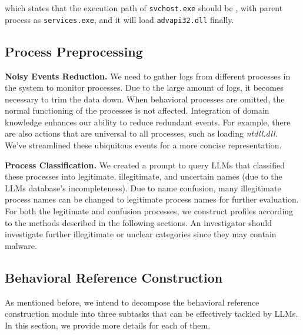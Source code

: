 which states that the execution path of \texttt{svchost.exe} should be , with parent process 
as \texttt{services.exe}, and it will load \texttt{advapi32.dll} finally.



\subsection{Process Preprocessing}
\noindent
{\bf Noisy Events Reduction.} 
We need to gather logs from different processes in the system to monitor processes.
Due to the large amount of logs, it becomes necessary to trim the data down. 
When behavioral processes are omitted, the normal functioning of the processes is not affected. Integration of domain knowledge enhances our ability to reduce redundant events. For example, there are also actions that are universal to all processes, such as loading \textit{ntdll.dll}. We've streamlined these ubiquitous events for a more concise representation.

\noindent
{\bf Process Classification.} \label{sec:classifition}
We created a prompt to query  LLMs that classified these processes into legitimate, illegitimate, and uncertain names (due to the LLMs database's incompleteness).
Due to name confusion, many illegitimate process names can be changed to legitimate process names for further evaluation.
For both the legitimate and confusion processes, we construct profiles according to the methods described in the following sections. An investigator should investigate further illegitimate or unclear categories since they may contain malware.

\subsection{Behavioral Reference Construction}
As mentioned before, we intend to decompose the behavioral reference construction module into three subtasks that can be effectively tackled by LLMs. In this section, we provide more details for each of them.
\label{sec:profile_con}

